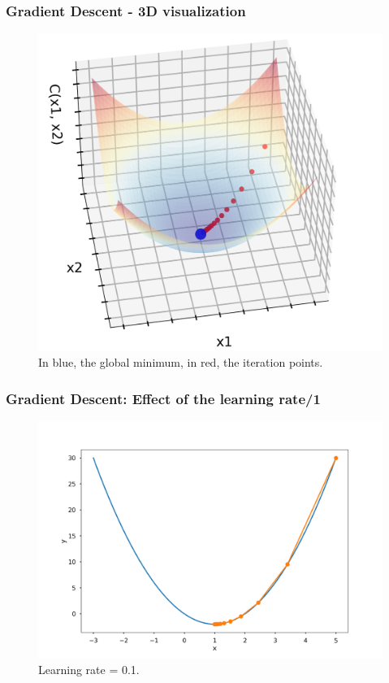 \documentclass{beamer}
\begin{document}
	\begin{frame}
		\frametitle{Gradient Descent - 3D visualization}
		\begin{figure}
			\centering
			\includegraphics[scale=0.4]{images/gradient_descent_3D}
			\caption{In blue, the global minimum, in red, the iteration points.}
		\end{figure}
	\end{frame}

	\begin{frame}
		\frametitle{Gradient Descent: Effect of the learning rate/1}
		\begin{figure}
			\centering
			\includegraphics[scale=0.3]{images/gradient_descent_1}
			\caption{Learning rate = 0.1.}
		\end{figure}
	\end{frame}
\end{document}
